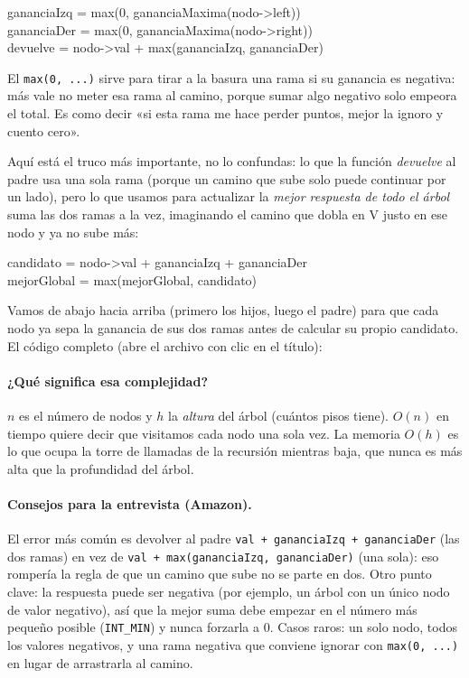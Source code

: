 \begin{center}
\ttfamily
gananciaIzq = max(0, gananciaMaxima(nodo->left))\\
gananciaDer = max(0, gananciaMaxima(nodo->right))\\
devuelve = nodo->val + max(gananciaIzq, gananciaDer)
\end{center}

\noindent El \texttt{max(0, ...)} sirve para tirar a la basura una rama si su
ganancia es negativa: más vale no meter esa rama al camino, porque sumar algo
negativo solo empeora el total. Es como decir «si esta rama me hace perder
puntos, mejor la ignoro y cuento cero».

Aquí está el truco más importante, no lo confundas: lo que la función
\emph{devuelve} al padre usa una sola rama (porque un camino que sube solo puede
continuar por un lado), pero lo que usamos para actualizar la \emph{mejor
respuesta de todo el árbol} suma las dos ramas a la vez, imaginando el camino que
dobla en V justo en ese nodo y ya no sube más:

\begin{center}
\ttfamily
candidato = nodo->val + gananciaIzq + gananciaDer\\
mejorGlobal = max(mejorGlobal, candidato)
\end{center}

\noindent Vamos de abajo hacia arriba (primero los hijos, luego el padre) para
que cada nodo ya sepa la ganancia de sus dos ramas antes de calcular su propio
candidato. El código completo (abre el archivo con clic en el título):




\paragraph{¿Qué significa esa complejidad?} $n$ es el número de nodos y $h$ la
\emph{altura} del árbol (cuántos pisos tiene). $O(n)$ en tiempo quiere decir que
visitamos cada nodo una sola vez. La memoria $O(h)$ es lo que ocupa la torre de
llamadas de la recursión mientras baja, que nunca es más alta que la
profundidad del árbol.

\paragraph{Consejos para la entrevista (Amazon).} El error más común es devolver
al padre \texttt{val + gananciaIzq + gananciaDer} (las dos ramas) en vez de
\texttt{val + max(gananciaIzq, gananciaDer)} (una sola): eso rompería la regla
de que un camino que sube no se parte en dos. Otro punto clave: la respuesta
puede ser negativa (por ejemplo, un árbol con un único nodo de valor negativo),
así que la mejor suma debe empezar en el número más pequeño posible
(\texttt{INT\_MIN}) y nunca forzarla a $0$. Casos raros: un solo nodo, todos los
valores negativos, y una rama negativa que conviene ignorar con
\texttt{max(0, ...)} en lugar de arrastrarla al camino.
